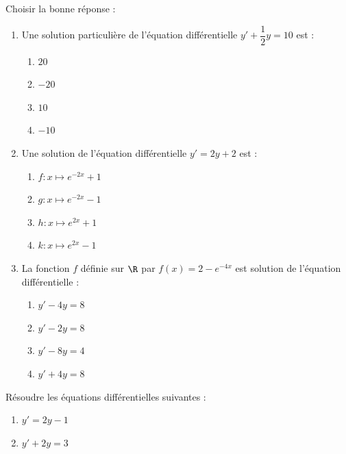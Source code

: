 \documentclass[a4paper,11pt,exos]{nsi} %
\begin{document}
\exo{}
Choisir la bonne réponse :
\begin{enumerate}
    \item Une solution particulière de l'équation différentielle $y'+\dfrac{1}{2}y=10$ est :
    \begin{multicols}{4}
        \begin{enumerate}[label=\ding{111}]
            \item $20$
            \item $-20$
            \item $10$
            \item $-10$
        \end{enumerate}
    \end{multicols}

    \item Une solution de l'équation différentielle $y'=2y+2$ est :
    \begin{multicols}{4}
        \begin{enumerate}[label=\ding{111}]
            \item $f:x\mapsto e^{-2x}+1$
            \item $g:x\mapsto e^{-2x}-1$
            \item $h:x\mapsto e^{2x}+1$
            \item $k:x\mapsto e^{2x}-1$
        \end{enumerate}
    \end{multicols}

    \item La fonction $f$ définie sur $\R$ par $f(x)=2-e^{-4x}$ est solution de l'équation différentielle :
    \begin{multicols}{2}
        \begin{enumerate}[label=\ding{111}]
            \item $y'-4y=8$
            \item $y'-2y=8$
            \item $y'-8y=4$
            \item $y'+4y=8$
        \end{enumerate}
    \end{multicols}
\end{enumerate}

\exo{}
Résoudre les équations différentielles suivantes :
\begin{multicols}{2}
    \begin{enumerate}
        \item $y'=2y-1$
        \item $y'+2y=3$
    \end{enumerate}
\end{multicols}
\end{document}
